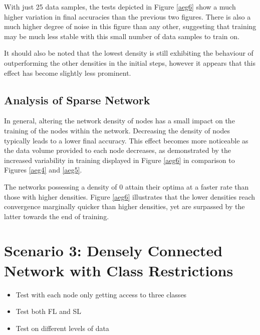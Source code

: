 With just 25 data samples, the tests depicted in Figure \ref{aeg6} show a much higher variation in final accuracies than the previous two figures. There is also a much higher degree of noise in this figure than any other, suggesting that training may be much less stable with this small number of data samples to train on.

It should also be noted that the lowest density is still exhibiting the behaviour of outperforming the other densities in the initial steps, however it appears that this effect has become slightly less prominent.

\subsection{Analysis of Sparse Network}
In general, altering the network density of nodes has a small impact on the training of the nodes within the network. Decreasing the density of nodes typically leads to a lower final accuracy. This effect becomes more noticeable as the data volume provided to each node decreases, as demonstrated by the increased variability in training displayed in Figure \ref{aeg6} in comparison to Figures \ref{aeg4} and \ref{aeg5}.

The networks possessing a density of 0 attain their optima at a faster rate than those with higher densities. Figure \ref{aeg6} illustrates that the lower densities reach convergence marginally quicker than higher densities, yet are surpassed by the latter towards the end of training.

\section{Scenario 3: Densely Connected Network with Class Restrictions}

\begin{itemize}
	\item Test with each node only getting access to three classes
	\item Test both FL and SL
	\item Test on different levels of data
\end{itemize}